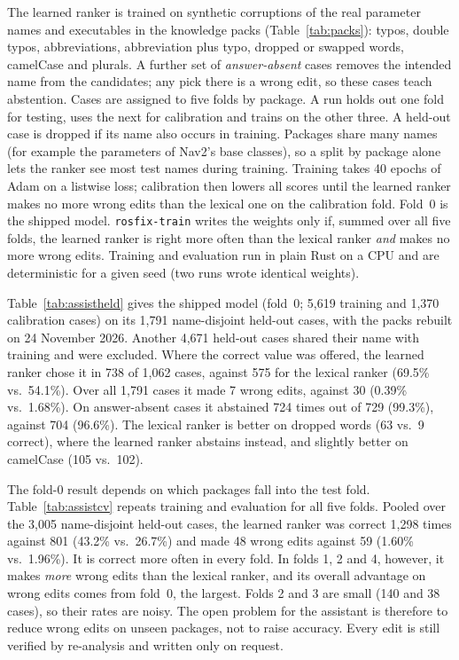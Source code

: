 \documentclass[conference]{IEEEtran}
\newcommand{\code}[1]{\texttt{#1}}
\begin{document}
The learned ranker is trained on synthetic corruptions of the real parameter names and
executables in the knowledge packs (Table~\ref{tab:packs}): typos, double typos, abbreviations,
abbreviation plus typo, dropped or swapped words, camelCase and plurals. A further set of
\emph{answer-absent} cases removes the intended name from the candidates; any pick there is a
wrong edit, so these cases teach abstention. Cases are assigned to five folds by package. A run
holds out one fold for testing, uses the next for calibration and trains on the other three. A
held-out case is dropped if its name also occurs in training. Packages share many names (for
example the parameters of Nav2's base classes), so a split by package alone lets the ranker see
most test names during training. Training takes 40 epochs of Adam on a listwise loss;
calibration then lowers all scores until the learned ranker makes no more wrong edits than the
lexical one on the calibration fold. Fold~0 is the shipped model. \code{rosfix-train} writes the
weights only if, summed over all five folds, the learned ranker is right more often than the
lexical ranker \emph{and} makes no more wrong edits. Training and evaluation run in plain Rust on
a CPU and are deterministic for a given seed (two runs wrote identical weights).

Table~\ref{tab:assistheld} gives the shipped model (fold~0; 5,619 training and 1,370 calibration
cases) on its 1,791 name-disjoint held-out cases, with the packs rebuilt on 24 November 2026.
Another 4,671 held-out cases shared their name with training and were excluded. Where the correct
value was offered, the learned ranker chose it in 738 of 1,062 cases, against 575 for the lexical
ranker (69.5\% vs.\ 54.1\%). Over all 1,791 cases it made 7 wrong edits, against 30 (0.39\%
vs.\ 1.68\%). On answer-absent cases it abstained 724 times out of 729 (99.3\%), against
704 (96.6\%). The lexical ranker is better on dropped words (63 vs.\ 9 correct), where the
learned ranker abstains instead, and slightly better on camelCase (105 vs.\ 102).

The fold-0 result depends on which packages fall into the test fold. Table~\ref{tab:assistcv}
repeats training and evaluation for all five folds. Pooled over the 3,005 name-disjoint held-out
cases, the learned ranker was correct 1,298 times against 801 (43.2\% vs.\ 26.7\%) and made 48
wrong edits against 59 (1.60\% vs.\ 1.96\%). It is correct more often in every fold. In folds 1,
2 and 4, however, it makes \emph{more} wrong edits than the lexical ranker, and its overall
advantage on wrong edits comes from fold~0, the largest. Folds 2 and 3 are small (140 and 38
cases), so their rates are noisy. The open problem for the assistant is therefore to reduce wrong
edits on unseen packages, not to raise accuracy. Every edit is still verified by re-analysis and
written only on request.
\end{document}
